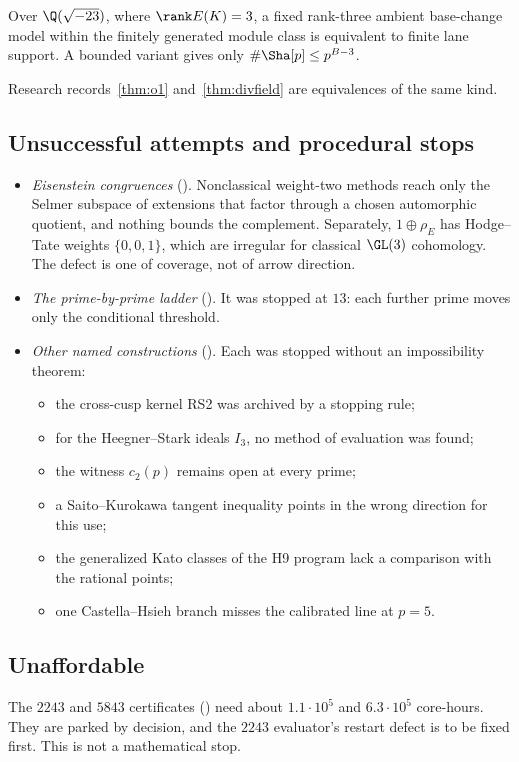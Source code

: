 \begin{researchrecord}\label{obs:stark}
Over $\Q(\sqrt{-23})$, where $\rank E(K)=3$, a fixed rank-three ambient base-change model within the finitely generated module class is equivalent to finite lane support. A bounded variant gives only $\#\Sha[p]\le p^{B-3}$.
\end{researchrecord}
Research records~\ref{thm:o1} and~\ref{thm:divfield} are equivalences of the same kind.

\subsection{Unsuccessful attempts and procedural stops}
\begin{itemize}[leftmargin=*]
\item \emph{Eisenstein congruences} (). Nonclassical weight-two methods reach only the Selmer subspace of extensions that factor through a chosen automorphic quotient, and nothing bounds the complement. Separately, $1\oplus\rho_E$ has Hodge--Tate weights $\{0,0,1\}$, which are irregular for classical $\GL(3)$ cohomology. The defect is one of coverage, not of arrow direction.
\item \emph{The prime-by-prime ladder} (). It was stopped at $13$: each further prime moves only the conditional threshold.
\item \emph{Other named constructions} (). Each was stopped without an impossibility theorem:
\begin{itemize}[leftmargin=*]
\item the cross-cusp kernel RS2 was archived by a stopping rule;
\item for the Heegner--Stark ideals $I_3$, no method of evaluation was found;
\item the witness $c_2(p)$ remains open at every prime;
\item a Saito--Kurokawa tangent inequality points in the wrong direction for this use;
\item the generalized Kato classes of the H9 program lack a comparison with the rational points;
\item one Castella--Hsieh branch misses the calibrated line at $p=5$.
\end{itemize}
\end{itemize}

\subsection{Unaffordable}
The $2243$ and $5843$ certificates () need about $1.1\cdot10^5$ and $6.3\cdot10^5$ core-hours. They are parked by decision, and the $2243$ evaluator's restart defect is to be fixed first. This is not a mathematical stop.
